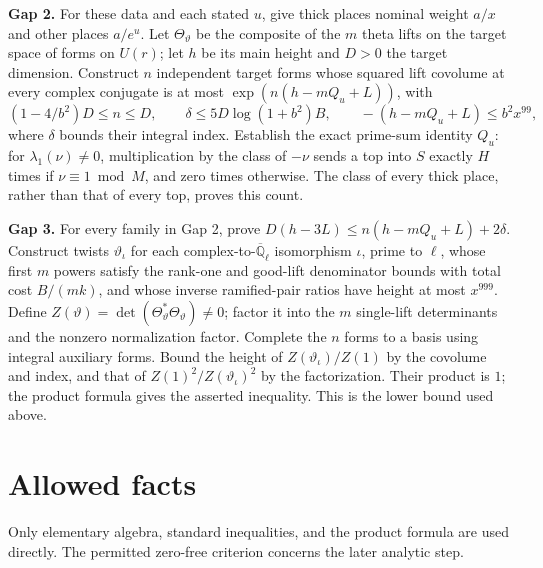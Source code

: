 \documentclass[11pt]{article}
\begin{document}
\medskip
\noindent\textbf{Gap 2.} For these data and each stated \(u\), give thick places nominal weight \(a/x\) and other places \(a/e^u\). Let \(\Theta_\vartheta\) be the composite of the \(m\) theta lifts on the target space of forms on \(U(r)\); let \(h\) be its main height and \(D>0\) the target dimension. Construct \(n\) independent target forms whose squared lift covolume at every complex conjugate is at most \(\exp(n(h-mQ_u+L))\), with
\[
(1-4/b^2)D\le n\le D,\qquad
\delta\le5D\log(1+b^2)B,\qquad
-(h-mQ_u+L)\le b^2x^{99},
\]
where \(\delta\) bounds their integral index. Establish the exact prime-sum identity \(Q_u\): for \(\lambda_1(\nu)\ne0\), multiplication by the class of \(-\nu\) sends a top into \(S\) exactly \(H\) times if \(\nu\equiv1\bmod M\), and zero times otherwise. The class of every thick place, rather than that of every top, proves this count.

\medskip
\noindent\textbf{Gap 3.} For every family in Gap 2, prove \(D(h-3L)\le n(h-mQ_u+L)+2\delta\). Construct twists \(\vartheta_\iota\) for each complex-to-\(\overline{\mathbb Q}_\ell\) isomorphism \(\iota\), prime to \(\ell\), whose first \(m\) powers satisfy the rank-one and good-lift denominator bounds with total cost \(B/(mk)\), and whose inverse ramified-pair ratios have height at most \(x^{999}\). Define \(Z(\vartheta)=\det(\Theta_\vartheta^*\Theta_\vartheta)\ne0\); factor it into the \(m\) single-lift determinants and the nonzero normalization factor. Complete the \(n\) forms to a basis using integral auxiliary forms. Bound the height of \(Z(\vartheta_\iota)/Z(1)\) by the covolume and index, and that of \(Z(1)^2/Z(\vartheta_\iota)^2\) by the factorization. Their product is \(1\); the product formula gives the asserted inequality. This is the lower bound used above.

\section*{Allowed facts}
Only elementary algebra, standard inequalities, and the product formula are used directly. The permitted zero-free criterion concerns the later analytic step.
\end{document}

